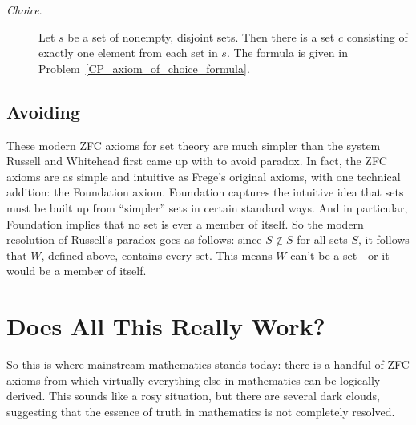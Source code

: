 \begin{description}
\item[\emph{Choice}.]  Let $s$
  be a set of nonempty, disjoint sets.  Then there is a set $c$
  consisting of exactly one element from each set in $s$.  The formula
  is given in Problem~\ref{CP_axiom_of_choice_formula}.

\end{description}

\subsection{Avoiding }

These modern ZFC axioms for set theory are much simpler than the system
Russell and Whitehead first came up with to avoid paradox.  In fact, the
ZFC axioms are as simple and intuitive as Frege's original axioms, with
one technical addition: the Foundation axiom.  Foundation captures the
intuitive idea that sets must be built up from ``simpler'' sets in certain
standard ways.  And in particular, Foundation implies that no set is ever
a member of itself.  So the modern resolution of Russell's paradox goes as
follows: since $S \not \in S$ for all sets $S$, it follows that $W$,
defined above, contains every set.  This means $W$ can't be a set---or it
would be a member of itself.

\begin{problems}

\classproblems
{}

\homeworkproblems
{}

\examproblems
{}
\end{problems}

\section{Does All This Really Work?}\label{setsreallywork}

So this is where mainstream mathematics stands today: there is a handful
of ZFC axioms from which virtually everything else in mathematics can be
logically derived.  This sounds like a rosy situation, but there are
several dark clouds, suggesting that the essence of truth in mathematics
is not completely resolved.

